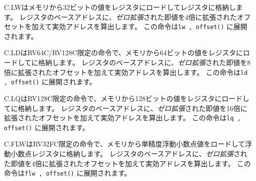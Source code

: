 \begin{comment}
C.LW loads a 32-bit value from memory into register {\em \rdprime}.  It computes
an effective address by adding the {\em zero}-extended offset, scaled by 4, to
the base address in register {\em \rsoneprime}.
It expands to {\tt lw \rdprime, offset(\rsoneprime)}.
\end{comment}
C.LWはメモリから32ビットの値をレジスタにロードして{\em \rdprime}レジスタに格納します。
レジスタのベースアドレスに、{\em ゼロ拡張}された即値を4倍に拡張されたオフセットを加えて実効アドレスを算出します。
この命令は{\tt lw \rdprime, offset(\rsoneprime)} に展開されます。

\begin{comment}
C.LD is an RV64C/RV128C-only instruction that loads a 64-bit value from memory into
register {\em \rdprime}.  It computes an effective address by adding the {\em
zero}-extended offset, scaled by 8, to the base address in register {\em
\rsoneprime}.
It expands to {\tt ld \rdprime, offset(\rsoneprime)}.
\end{comment}
C.LDはRV64C/RV128C限定の命令で、メモリから64ビットの値をレジスタにロードして{\em \rdprime}に格納します。
レジスタのベースアドレスに、{\em ゼロ拡張}された即値を8倍に拡張されたオフセットを加えて実効アドレスを算出します。
この命令は{\tt ld \rdprime, offset(\rsoneprime)} に展開されます。

\begin{comment}
C.LQ is an RV128C-only instruction that loads a 128-bit value from memory into
register {\em \rdprime}.  It computes an effective address by adding the {\em
zero}-extended offset, scaled by 16, to the base address in register {\em
\rsoneprime}.
It expands to {\tt lq \rdprime, offset(\rsoneprime)}.
\end{comment}
C.LQはRV128C限定の命令で、メモリから128ビットの値をレジスタにロードして{\em \rdprime}に格納します。
レジスタのベースアドレスに、{\em ゼロ拡張}された即値を16倍に拡張されたオフセットを加えて実効アドレスを算出します。
この命令は{\tt lq \rdprime, offset(\rsoneprime)} に展開されます。

\begin{comment}
C.FLW is an RV32FC-only instruction that loads a single-precision
floating-point value from memory into floating-point register {\em \rdprime}.  It
computes an effective address by adding the {\em zero}-extended offset, scaled
by 4, to the base address in register {\em \rsoneprime}.  It expands to {\tt flw
\rdprime, offset(\rsoneprime)}.
\end{comment}
C.FLWはRV32FC限定の命令で、メモリから単精度浮動小数点値をロードして浮動小数点レジスタ{\em \rdprime}に格納します。
レジスタのベースアドレスに、{\em ゼロ拡張}された即値を4倍に拡張されたオフセットを加えて実効アドレスを算出します。
この命令は{\tt flw \rdprime, offset(\rsoneprime)} に展開されます。

